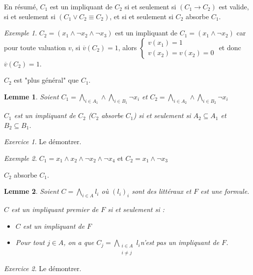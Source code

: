 \documentclass[]{article}
\newtheorem{mylemma}{Lemme}
\theoremstyle{remark}
\newtheorem{myexer}{Exercice}
\newtheorem{myexmpl}{Exemple}
\theoremstyle{definition}
\begin{document}
En résumé, $C_1$ est un impliquant de $C_2$ si et seulement si $(C_1 \rightarrow C_2)$ est valide, si et seulement si $(C_1 \lor C_2 \equiv C_2)$, et si et seulement si $C_2$ absorbe $C_1$.

\begin{myexmpl}
	$C_2 = (x_1 \land \neg x_2 \land \neg x_3)$ est un impliquant de $C_1=(x_1 \land \neg x_2)$ car pour toute valuation $v$, si $\overline{v}(C_2)=1$, alors 
	$\left\{
		\begin{array}{l}
			v(x_1)=1 \\
			v(x_2) = v(x_2)=0
		\end{array}
	\right.$ et donc $\overline{v}(C_2)=1$.
	
	$C_2$ est "plus général" que $C_1$.
\end{myexmpl}

\begin{mylemma}
	Soient $\displaystyle C_1 = \bigwedge_{i \in A_1} \land \bigwedge_{i \in B_1} \neg x_i$ et $\displaystyle C_2 = \bigwedge_{i \in A_2} \land \bigwedge_{i \in B_2} \neg x_i$
	
	$C_1$ est un impliquant de $C_2$ ($C_2$ absorbe $C_1$) si et seulement si $A_2 \subseteq A_1$ et $B_2 \subseteq B_1$.
\end{mylemma}

\begin{myexer}
	Le démontrer.
\end{myexer}

\begin{myexmpl}
	$C_1=x_1 \land x_2 \land\neg x_2\land \neg x_4$ et $C_2 = x_1 \land \neg x_3$
	
	$C_2$ absorbe $C_1$.
\end{myexmpl}

\begin{mylemma}
	Soient $\displaystyle C=\bigwedge_{i \in A} l_i$ où $(l_i)_i$ sont des littéraux et $F$ est une formule.
	
	$C$ est un impliquant premier de $F$ si et seulement si :
	\begin{itemize}
		\item $C$ est un impliquant de $F$
		\item Pour tout  $j \in A$, on a que $\displaystyle C_j = \bigwedge\limits_{\substack{i \in A \\ i \neq j}} l_i$n'est pas un impliquant de $F$.
	\end{itemize}
\end{mylemma}

\begin{myexer}
	Le démontrer.
\end{myexer}
\end{document}

